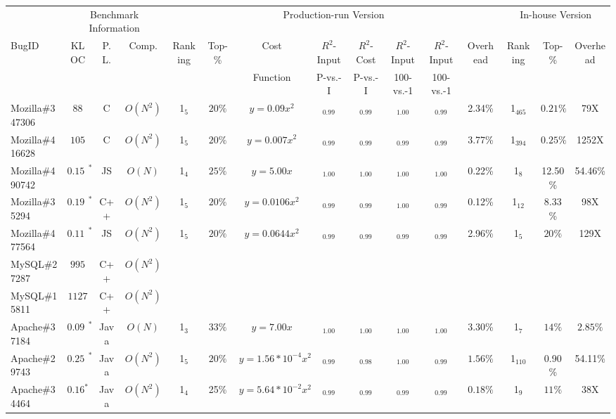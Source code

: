 \begin{table*}[h!]
  \centering
  \scriptsize
  {
  \newcommand{\Yes}[1]{\checkmark{}$_#1$}
  \newcommand{\No}[0]{-}
  {
  \begin{tabular}{lccc|cccccccc|ccc}
    \toprule
        & \multicolumn{3}{c}{Benchmark Information} & \multicolumn{8}{c}{Production-run Version} & \multicolumn{3}{c}{In-house Version}   \\

    \cmidrule(lr){2-4}
    \cmidrule(lr){5-12}
    \cmidrule(lr){13-15}
    {BugID} & {KLOC} & {P. L.} & {Comp.} & {Ranking} & Top-\%  & Cost  & $R^2$-Input  & $R^2$-Cost & $R^2$-Input    & $R^2$-Input       & {Overhead} & {Ranking} & Top-\% & {Overhead}  \\
          &    &    &        &   &   &   Function    & \tiny{P-vs.-I} & \tiny{P-vs.-I} & \tiny{100-vs.-1} & \tiny{100-vs.-1}           &  & \\
    \midrule
    Mozilla\#347306 &$88$&C&$O(N^{2})$&1$_{{5}}$&$20\%$&$y=0.09x^2$&\Yes{{0.99}}&\Yes{{0.99}}&\Yes{{1.00}}&\Yes{{0.99}}&2.34\% &1$_{465}$ & $0.21\%$& 79X \\
    Mozilla\#416628 &$105$&C&$O(N^{2})$&1$_{{5}}$&$20\%$&$y=0.007x^2$&\Yes{{0.99}}&\Yes{{0.99}}&\Yes{{0.99}}&\Yes{{0.99}}&3.77\%&1$_{394}$ &$0.25\%$& 1252X \\
    Mozilla\#490742& $0.157^*$&JS & $O(N)$ &1$_{{4}}$&$25\%$&$y=5.00x$&\Yes{{1.00}}&\Yes{{1.00}}&\Yes{{1.00}}&\Yes{{1.00}}&0.22\%&1$_{8}$&12.50\%& 54.46\%\\  
    Mozilla\#35294&$0.195^*$&C++&$O(N^{2})$&1$_{{5}}$&$20\%$&$y=0.0106x^2$& \Yes{{0.99}}&\Yes{{0.99}}&\Yes{{1.00}} &\Yes{{0.99}}&0.12\%&1$_{{12}}$& 8.33\%&98X  \\ 
    Mozilla\#477564&$0.116^*$&JS&$O(N^{2})$&1$_{{5}}$&$20\%$&$y=0.0644x^2$&\Yes{{0.99}}&\Yes{{0.99}}&\Yes{{0.99}}&\Yes{{0.99}}&2.96\%&1$_{{5}}$&$20\%$ &129X\\
    \midrule
    MySQL\#27287&$995$&C++&$O(N^{2})$&\\
    MySQL\#15811&$1127$&C++&$O(N^{2})$&\\
    \midrule
    Apache\#37184&$0.092^*$&Java&$O(N)$&1$_{{3}}$&$33\%$&$y=7.00x$&\Yes{{1.00}}&\Yes{{1.00}}&\Yes{{1.00}}&\Yes{{1.00}}&3.30\%&1$_{{7}}$&$14\%$&$2.85\%$\\
    Apache\#29743&$0.257^*$&Java&$O(N^{2})$&1$_{{5}}$&$20\%$&$y=1.56*10^{-4}x^2$&\Yes{{0.99}}&\Yes{{0.98}}&\Yes{{1.00}}&\Yes{{0.99}}&$1.56\%$&1$_{{110}}$&0.90\%&54.11\%\\
    Apache\#34464&$0.16^*$&Java&$O(N^{2})$&1$_{{4}}$&25\%&$y=5.64*10^{-2}x^2$&\Yes{{0.99}}&\Yes{{0.99}}&\Yes{{0.99}}&\Yes{{0.99}}&$0.18\%$&1$_{{9}}$&$11\%$&38X\\

\end{tabular}}}
\end{table*}
